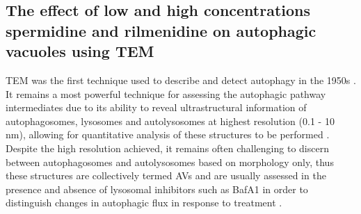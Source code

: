 {\subsection{The effect of low and high concentrations spermidine and rilmenidine on autophagic vacuoles using TEM}
TEM was the first technique used to describe and detect autophagy in the 1950s \citep{Deter1967}. It remains a most powerful technique for assessing the autophagic pathway intermediates due to its ability to reveal ultrastructural information of autophagosomes, lysosomes and autolysosomes at highest resolution (0.1 - 10 nm), allowing for quantitative analysis of these structures to be performed \citep{klionsky2016}. Despite the high resolution achieved, it remains often challenging to discern between autophagosomes and autolysosomes based on morphology only, thus these structures are collectively termed AVs \citep{Eskelinen2008,klionsky2016} and are usually assessed in the presence and absence of lysosomal inhibitors such as BafA1 in order to distinguish changes in autophagic flux in response to treatment \citep{Eskelinen2011,klionsky2016}.

}
